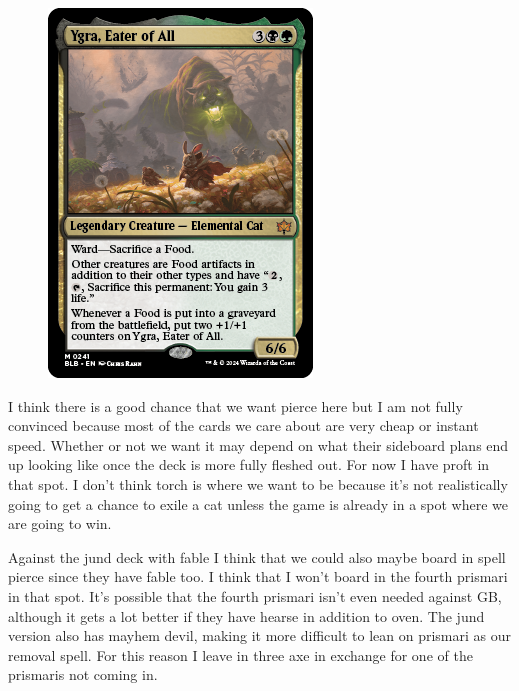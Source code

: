 \documentclass[12pt]{article}
\begin{document}
\begin{figure}
    \includegraphics[width=0.9\linewidth]{Cards/ygra.jpg}
\end{figure}

I think there is a good chance that we want pierce here but I am not fully convinced because most of the cards we care about are very cheap or instant speed. Whether or not we want it may depend on what their sideboard plans end up looking like once the deck is more fully fleshed out. For now I have proft in that spot. I don't think torch is where we want to be because it's not realistically going to get a chance to exile a cat unless the game is already in a spot where we are going to win.

Against the jund deck with fable I think that we could also maybe board in spell pierce since they have fable too. I think that I won't board in the fourth prismari in that spot. It's possible that the fourth prismari isn't even needed against GB, although it gets a lot better if they have hearse in addition to oven. The jund version also has mayhem devil, making it more difficult to lean on prismari as our removal spell. For this reason I leave in three axe in exchange for one of the prismaris not coming in.
\end{document}
